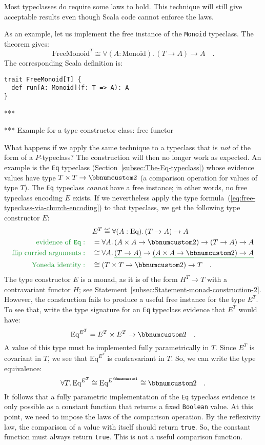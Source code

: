 Most typeclasses do require some laws to hold. This technique will
still give acceptable results even though Scala code cannot enforce
the laws. 

As an example, let us implement the free instance of the \lstinline!Monoid!
typeclass. The theorem gives:
\[
\text{FreeMonoid}^{T}\cong\forall(A:\text{Monoid}).\,(T\rightarrow A)\rightarrow A\quad.
\]
The corresponding Scala definition is:
\begin{lstlisting}
trait FreeMonoid[T] {
  def run[A: Monoid](f: T => A): A
}
\end{lstlisting}
{*}{*}{*}

{*}{*}{*} Example for a type constructor class: free functor

What happens if we apply the same technique to a typeclass that is
\emph{not} of the form of a $P$-typeclass? The construction will
then no longer work as expected. An example is the \lstinline!Eq!
typeclass (Section~\ref{subsec:The-Eq-typeclass}) whose evidence
values have type $T\times T\rightarrow\bbnum 2$ (a comparison operation
for values of type $T$). The \lstinline!Eq! typeclass \emph{cannot}
have a free instance; in other words, no free typeclass encoding $E$
exists. If we nevertheless apply the type formula~(\ref{eq:free-typeclass-via-church-encoding})
to that typeclass, we get the following type constructor $E$:
\begin{align*}
 & E^{T}\triangleq\forall(A:\text{Eq}).\,(T\rightarrow A)\rightarrow A\\
{\color{greenunder}\text{evidence of \texttt{Eq}}:}\quad & =\forall A.\,(A\times A\rightarrow\bbnum 2)\rightarrow(T\rightarrow A)\rightarrow A\\
{\color{greenunder}\text{flip curried arguments}:}\quad & \cong\forall A.\,\gunderline{(T\rightarrow A)}\rightarrow\gunderline{(A\times A\rightarrow\bbnum 2)\rightarrow A}\\
{\color{greenunder}\text{Yoneda identity}:}\quad & \cong(T\times T\rightarrow\bbnum 2)\rightarrow T\quad.
\end{align*}
The type constructor $E$ is a monad, as it is of the form $H^{T}\rightarrow T$
with a contravariant functor $H$; see Statement~\ref{subsec:Statement-monad-construction-2}.
However, the construction fails to produce a useful free instance
for the type $E^{T}$. To see that, write the type signature for an
\lstinline!Eq! typeclass evidence that $E^{T}$ would have:
\[
\text{Eq}^{E^{T}}=E^{T}\times E^{T}\rightarrow\bbnum 2\quad.
\]
A value of this type must be implemented fully parametrically in $T$.
Since $E^{T}$ is covariant in $T$, we see that $\text{Eq}^{E^{T}}$
is contravariant in $T$. So, we can write the type equivalence:
\[
\forall T.\,\text{Eq}^{E^{T}}\cong\text{Eq}^{E^{\bbnum 1}}\cong\bbnum 2\quad.
\]
It follows that a fully parametric implementation of the \lstinline!Eq!
typeclass evidence is only possible as a constant function that returns
a fixed \lstinline!Boolean! value. At this point, we need to impose
the laws of the comparison operation. By the reflexivity law,
the comparison of a value with itself should return \lstinline!true!.
So, the constant function must always return \lstinline!true!. This
is not a useful comparison function.

